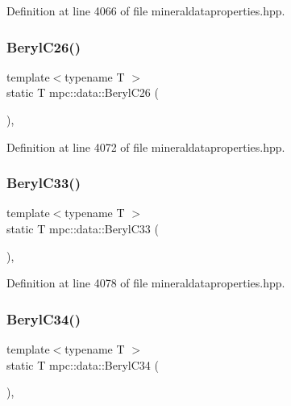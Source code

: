 Definition at line 4066 of file mineraldataproperties.\+hpp.

\mbox{\label{namespacempc_1_1data_a29defc7bc4b497e9f308699ac1b158a4}} 
\subsubsection{\texorpdfstring{Beryl\+C26()}{BerylC26()}}
{\footnotesize\ttfamily template$<$typename T $>$ \\
static T mpc\+::data\+::\+Beryl\+C26 (\begin{DoxyParamCaption}{ }\end{DoxyParamCaption})\hspace{0.3cm}{\ttfamily [inline]}, {\ttfamily [static]}}



Definition at line 4072 of file mineraldataproperties.\+hpp.

\mbox{\label{namespacempc_1_1data_a0b42ee7f60437147a4dfd2eaa741814b}} 
\subsubsection{\texorpdfstring{Beryl\+C33()}{BerylC33()}}
{\footnotesize\ttfamily template$<$typename T $>$ \\
static T mpc\+::data\+::\+Beryl\+C33 (\begin{DoxyParamCaption}{ }\end{DoxyParamCaption})\hspace{0.3cm}{\ttfamily [inline]}, {\ttfamily [static]}}



Definition at line 4078 of file mineraldataproperties.\+hpp.

\mbox{\label{namespacempc_1_1data_ab1ccd81790bafbfb42636b50043d3c09}} 
\subsubsection{\texorpdfstring{Beryl\+C34()}{BerylC34()}}
{\footnotesize\ttfamily template$<$typename T $>$ \\
static T mpc\+::data\+::\+Beryl\+C34 (\begin{DoxyParamCaption}{ }\end{DoxyParamCaption})\hspace{0.3cm}{\ttfamily [inline]}, {\ttfamily [static]}}



